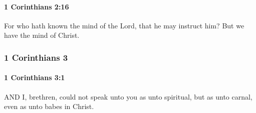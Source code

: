 		\paragraph{1 Corinthians 2:16} %
			\label{1CORINTHIANS-2-16}

			For who hath known the mind of the Lord, that he may instruct him? But we have the mind of Christ.

			\begin{framed}
			\scriptsize
				\begin{compactdesc}
					\item[SBLG] 
				\end{compactdesc}
			\end{framed}

	\subsubsection{1 Corinthians 3} %
		\label{1CORINTHIANS-3}
		
		\paragraph{1 Corinthians 3:1} %
			\label{1CORINTHIANS-3-1}

			AND I, brethren, could not speak unto you as unto spiritual, but as unto carnal, even as unto babes in Christ.

